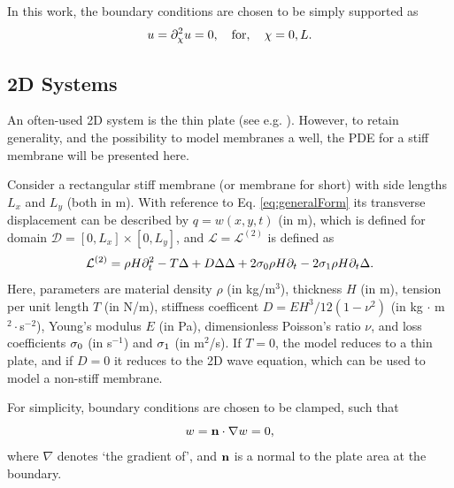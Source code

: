 \documentclass{article}
\begin{document}
In this work, the boundary conditions are chosen to be simply supported as
\begin{equation}
    u = \partial_{\chi}^2 u = 0, \quad \text{for}, \quad \chi = 0, L.
\end{equation}

\subsection{2D Systems}
An often-used 2D system is the thin plate (see e.g. \cite{Webb2015, Willemsen2020}). However, to retain generality, and the possibility to model membranes a well, the PDE for a stiff membrane will be presented here.

Consider a rectangular stiff membrane (or membrane for short) with side lengths $L_x$ and $L_y$ (both in m). With reference to Eq. \eqref{eq:generalForm} its transverse displacement can be described by $q = w(x, y, t)$ (in m), which is defined for domain
$\mathcal{D} = [0, L_x] \times [0, L_y]$, and $\mathcal{L}=\mathcal{L}^{(2)}$ is defined as \cite{Fletcher1998}
\begin{equation}\label{eq:stiffMembrane}
        \mathcal{L}^{(2)} = \rho H\partial_t^2 - T \Delta + D \Delta\Delta+ 2\sigma_{0}\rho H\partial_t - 2 \sigma_{1}\rho H\partial_t\Delta.
\end{equation}
Here, parameters are material density $\rho$ (in kg/m$^3$), thickness $H$ (in m), tension per unit length $T$ (in N/m), stiffness coefficent $D = E H^3 / 12 (1-\nu^2)$ (in kg $\cdot$ m$^2\cdot$s$^{-2}$), Young's modulus $E$ (in Pa), dimensionless Poisson's ratio $\nu$, and loss coefficients $\sigma_{0}$ (in s$^{-1}$) and $\sigma_{1}$ (in m$^2$/s).
If $T = 0$, the model reduces to a thin plate, and if $D=0$ it reduces to the 2D wave equation, which can be used to model a non-stiff membrane.

For simplicity, boundary conditions are chosen to be clamped, such that
\begin{equation}
        w = {\bf n} \cdot \nabla w = 0,
\end{equation}
where $\nabla$ denotes `the gradient of', and ${\bf n}$ is a normal to the plate area at the boundary.
\end{document}
